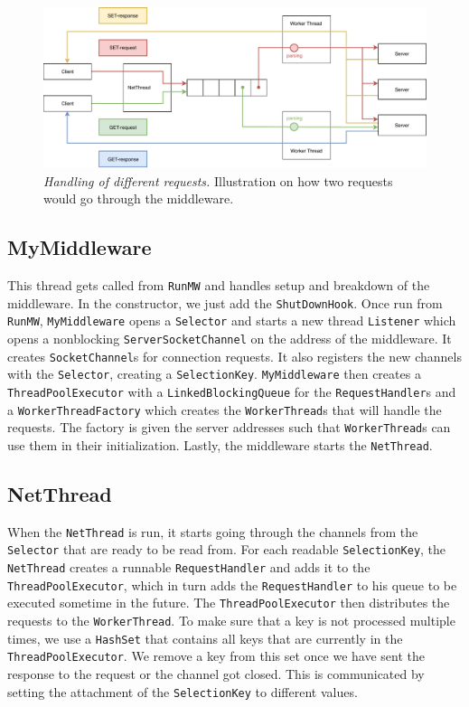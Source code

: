 \documentclass[11pt,a4paper]{article}
\newcommand{\co}[1]{\texttt{#1}}
\begin{document}
\begin{figure}[!htb]
\centering
\includegraphics[width=\textwidth]{graphics/getset.pdf}
\caption{\textit{Handling of different requests.} Illustration on how two requests would go through the middleware.}
\label{Figure:getset}
\end{figure}

\subsection{MyMiddleware}
This thread gets called from \co{RunMW} and handles setup and breakdown of the middleware. In the constructor, we just add the \co{ShutDownHook}. Once run from \co{RunMW}, \co{MyMiddleware} opens a \co{Selector} and starts a new thread \co{Listener} which opens a nonblocking \co{ServerSocketChannel} on the address of the middleware. It creates \co{SocketChannel}s for connection requests. It also registers the new channels with the \co{Selector}, creating a \co{SelectionKey}. \co{MyMiddleware} then creates a \co{ThreadPoolExecutor} with a \co{LinkedBlockingQueue} for the \co{RequestHandler}s and a \co{WorkerThreadFactory} which creates the \co{WorkerThread}s that will handle the requests. The factory is given the server addresses such that \co{WorkerThread}s can use them in their initialization. Lastly, the middleware starts the \co{NetThread}.

\subsection{NetThread}
When the \co{NetThread} is run, it starts going through the channels from the \co{Selector} that are ready to be read from. For each readable \co{SelectionKey}, the \co{NetThread} creates a runnable \co{RequestHandler} and adds it to the \co{ThreadPoolExecutor}, which in turn adds the \co{RequestHandler} to his queue to be executed sometime in the future. The \co{ThreadPoolExecutor} then distributes the requests to the \co{WorkerThread}. To make sure that a key is not processed multiple times, we use a \co{HashSet} that contains all keys that are currently in the \co{ThreadPoolExecutor}. We remove a key from this set once we have sent the response to the request or the channel got closed. This is communicated by setting the attachment of the \co{SelectionKey} to different values.
\end{document}
